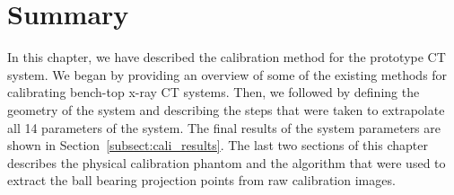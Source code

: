 \section{Summary}
In this chapter, we have described the calibration method for the prototype CT system.  We began by providing an overview of some of the existing methods for calibrating bench-top x-ray CT systems.  Then, we followed by defining the geometry of the system and describing the steps that were taken to extrapolate all 14 parameters of the system.  The final results of the system parameters are shown in Section~\ref{subsect:cali_results}.  The last two sections of this chapter describes the physical calibration phantom and the algorithm that were used to extract the ball bearing projection points from raw calibration images.  
%
%
%
